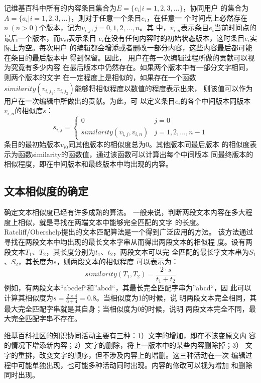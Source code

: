 记维基百科中所有的内容条目集合为$E=\{e_i|i=1,2,3,\ldots \}$，协同用户
的集合为$A=\{a_i|i=1,2,3,\ldots \}$，则对于任意一个条目$e_i$，在任意一
个时间点上必然存在$n \ (n>0)$个版本，记为$v_{i,j} , j=0,1,2,\ldots,n$。其
中，$v_{i,n}$表示条目$e_i$当前时间点的最后一个版本，而$v_{i0}$表示条目
$e_i$在没有任何内容时的初始状态版本，这时条目$e_i$实际上为空。每次用户
的编辑都会增添或者删改一部分内容，这些内容最后都可能在条目的最后版本中
得到保留。因此， 用户在每一次编辑过程所做的贡献可以视为究竟有多少内容
在最后版本中仍然存在。如果两个版本中有一部分文字相同，则两个版本的文字
在一定程度上是相似的，如果存在一个函数
$similarity(v_{i,j_1},v_{i,j_2})$能够将相似程度以数值的程度表示出来，
则该值可以作为用户在一次编辑中所做出的贡献。为此，可
以定义条目$e_i$的各个中间版本同版本$v_{i,n}$的相似度$s$：
\[
s_{i,j}=
\left\{
  \begin{array}{ll}
   0&j=0\\
   similarity(v_{i,j},v_{i,n})&j=1,2,\ldots,n-1 
  \end{array}
  \right.
\]
条目的最初始版本$v_{i0}$同其他版本的相似度总为$0$。其他版本同最后版本
的相似度表示为函数similarity的函数值，通过该函数可以计算出每个中间版本
同最终版本的相似程度，即在中间版本和最终版本中均出现的内容。

\subsection{文本相似度的确定}
\label{sec:similarity}

确定文本相似度已经有许多成熟的算法。
一般来说，判断两段文本内容在多大程度上相似，就是寻找在两端文本中能够完全匹配的文字
的长度。Ratcliff/Obershelp提出的文本匹配算法是一个得到广泛应用的方法。
该方法通过寻找在两段文本中均出现的最长文本字串从而得出两段文本的相似程
度。设有两段文本$T_1$、$T_2$，其长度分别为$t_1$、$t_2$，两段文本可以完
全匹配的最长字文本串为$S_1$、$S_2$，其长度为$s$，则两段文本的相似程度
可以表示为：
\[
similarity(T_1,T_2)=\frac{2 \cdot  s}{t_1+t_2}
\]
例如，有两段文本“abcdef“和”abcd“，其最长完全匹配字串为”abcd“，因
此可以计算其相似度为$s=\frac{2 \times 4}{6+4}=0.8$。当相似度为1的时候，说
明两段文本完全相同，其最大完全匹配字串就是其自身；当相似度为0的时候，说明
两段文本完全不同，最大完全匹配字串不存在。


维基百科社区的知识协同活动主要有三种：1）文字的增加，即在不该变原文内
容的情况下增添新内容；2）文字的删除，将上一版本中的某些内容删除掉；3）
文字的重排，改变文字的顺序，但不涉及内容上的增删。这三种活动在一次
编辑过程中可能单独出现，也可能多种活动同时出现。内容的修改可以视为增加
和删除同时出现。

